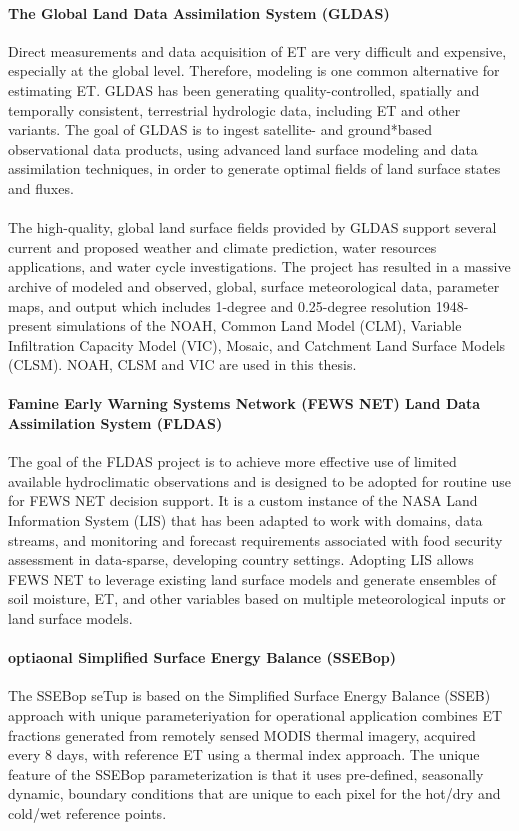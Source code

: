 \paragraph{The Global Land Data Assimilation System (GLDAS)}
Direct measurements and data acquisition of ET are very difficult and expensive, especially at the global level. Therefore, modeling is one common alternative for estimating ET. GLDAS has been generating quality-controlled, spatially and temporally consistent, terrestrial hydrologic data, including ET and other variants. The goal of GLDAS is to ingest satellite- and ground*based observational data products, using advanced land surface modeling and data assimilation techniques, in order to generate optimal fields of land surface states and fluxes.\\\\
The high-quality, global land surface fields provided by GLDAS support several current and proposed weather and climate prediction, water resources applications, and water cycle investigations. The project has resulted in a massive archive of modeled and observed, global, surface meteorological data, parameter maps, and output which includes 1-degree and 0.25-degree resolution 1948-present simulations of the NOAH, Common Land Model (CLM), Variable Infiltration Capacity Model (VIC), Mosaic, and Catchment Land Surface Models (CLSM). NOAH, CLSM and VIC are used in this thesis. 
\paragraph{Famine Early Warning Systems Network (FEWS NET) Land Data Assimilation System (FLDAS)}
The goal of the FLDAS project is to achieve more effective use of limited available hydroclimatic observations and is designed to be adopted for routine use for FEWS NET decision support. It is a custom instance of the NASA Land Information System (LIS) that has been adapted to work with domains, data streams, and monitoring and forecast requirements associated with food security assessment in data-sparse, developing country settings. Adopting LIS allows FEWS NET to leverage existing land surface models and generate ensembles of soil moisture, ET, and other variables based on multiple meteorological inputs or land surface models.
\paragraph{optiaonal Simplified Surface Energy Balance (SSEBop)}
The SSEBop seTup is based on the Simplified Surface Energy Balance (SSEB) approach with unique parameteriyation for operational application combines ET fractions generated from remotely sensed MODIS thermal imagery, acquired every 8 days, with reference ET using a thermal index approach. The unique feature of the SSEBop parameterization is that it uses pre-defined, seasonally dynamic, boundary conditions that are unique to each pixel for the hot/dry and cold/wet reference points.
